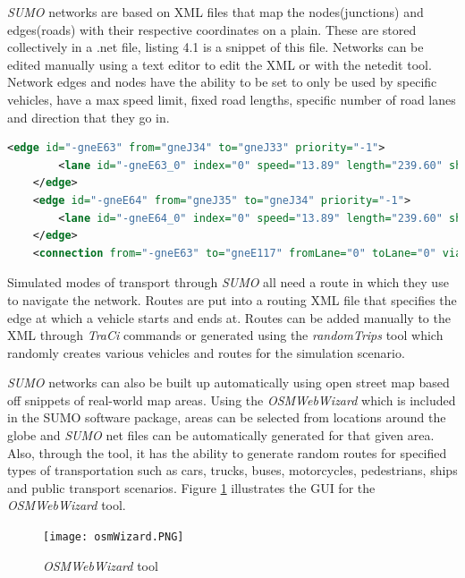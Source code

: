 \documentclass[11pt]{report}
\begin{document}
\emph{SUMO} networks are based on XML files that map the nodes(junctions) and edges(roads) with their respective coordinates on a plain. These are stored collectively in a .net file, listing 4.1 is a snippet of this file. Networks can be edited manually using a text editor to edit the XML or with the netedit tool. Network edges and nodes have the ability to be set to only be used by specific vehicles, have a max speed limit, fixed road lengths, specific number of road lanes and direction that they go in. 

\begin{lstlisting}[language=XML, caption=Example of SUMO net file XML, label={lst:1}]
    <edge id="-gneE63" from="gneJ34" to="gneJ33" priority="-1">
        <lane id="-gneE63_0" index="0" speed="13.89" length="239.60" shape="746.80,-501.60 507.20,-501.60"/>
    </edge>
    <edge id="-gneE64" from="gneJ35" to="gneJ34" priority="-1">
        <lane id="-gneE64_0" index="0" speed="13.89" length="239.60" shape="751.60,-257.20 751.60,-496.80"/>
    </edge>
    <connection from="-gneE63" to="gneE117" fromLane="0" toLane="0" via=":gneJ33_0_0" dir="s" state="M"/>
\end{lstlisting}

Simulated modes of transport through \emph{SUMO} all need a route in which they use to navigate the network. Routes are put into a routing XML file that specifies the edge at which a vehicle starts and ends at. Routes can be added manually to the XML through \emph{TraCi} commands or generated using the \emph{randomTrips} tool which randomly creates various vehicles and routes for the simulation scenario.

\emph{SUMO} networks can also be built up automatically using open street map based off snippets of real-world map areas. Using the \emph{OSMWebWizard} which is included in the SUMO software package, areas can be selected from locations around the globe and \emph{SUMO} net files can be automatically generated for that given area. Also, through the tool, it has the ability to generate random routes for specified types of transportation such as cars, trucks, buses, motorcycles, pedestrians, ships and public transport scenarios. Figure \ref{fig:7} illustrates the GUI for the \emph{OSMWebWizard} tool.

\begin{figure}[h!]
  \centering
  \texttt{[image: osmWizard.PNG]}
  \caption{\emph{OSMWebWizard} tool}
  \label{fig:7}
\end{figure}
\end{document}
